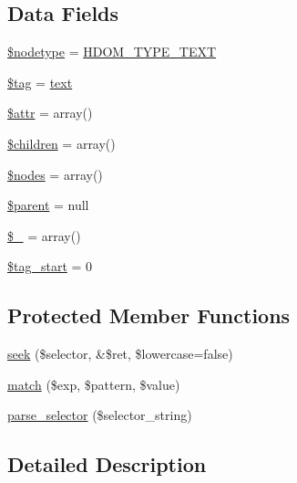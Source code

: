 \subsection*{Data Fields}
\begin{DoxyCompactItemize}
\item 
\hyperlink{classsimple__html__dom__node_abc1baa5da51bb7404ed787754af7e28b}{\$nodetype} = \hyperlink{simple__html__dom_8php_a453ed0a38bfe7684e94b0a2462317581}{H\+D\+O\+M\+\_\+\+T\+Y\+P\+E\+\_\+\+T\+E\+XT}
\item 
\hyperlink{classsimple__html__dom__node_a81d5015d41ed8ec66e9db8cdc5db9555}{\$tag} = \textquotesingle{}\hyperlink{classsimple__html__dom__node_a37df362c2f77a0045fa8af094f432238}{text}\textquotesingle{}
\item 
\hyperlink{classsimple__html__dom__node_a0b41385738b43ee6b8668650e7a4c990}{\$attr} = array()
\item 
\hyperlink{classsimple__html__dom__node_aafda1a84fe840800c9884c167093f759}{\$children} = array()
\item 
\hyperlink{classsimple__html__dom__node_afc84f46342a660cca8589570197bc421}{\$nodes} = array()
\item 
\hyperlink{classsimple__html__dom__node_a4e2313a4b35b72a06ac45fd38960f677}{\$parent} = null
\item 
\hyperlink{classsimple__html__dom__node_a4d36a5af9eae86547e70574573b45f33}{\$\+\_\+} = array()
\item 
\hyperlink{classsimple__html__dom__node_af1af90d3ddaae5df362bdbfa7a5eb7e4}{\$tag\+\_\+start} = 0
\end{DoxyCompactItemize}
\subsection*{Protected Member Functions}
\begin{DoxyCompactItemize}
\item 
\hyperlink{classsimple__html__dom__node_a55c896ff710c8cb226a17ff3d6e0c17a}{seek} (\$selector, \&\$ret, \$lowercase=false)
\item 
\hyperlink{classsimple__html__dom__node_a9c8fedd7bb7953c0849835ace1d11852}{match} (\$exp, \$pattern, \$value)
\item 
\hyperlink{classsimple__html__dom__node_a39d57c8087a0b463eeb942a1d8042013}{parse\+\_\+selector} (\$selector\+\_\+string)
\end{DoxyCompactItemize}


\subsection{Detailed Description}



